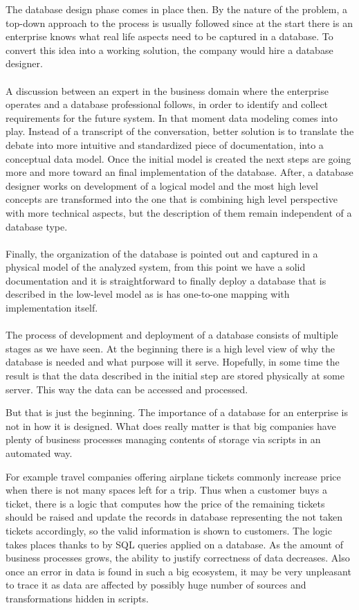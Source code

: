 The database design phase comes in place then. By the nature of the problem, a top-down approach to the process is usually followed since at the start there is an enterprise knows what real life aspects need to be captured in a database. To convert this idea into a working solution, the company would hire a database designer. \\ \\
A discussion between an expert in the business domain where the enterprise operates and a database professional follows, in order to identify and collect requirements for the future system.
In that moment data modeling comes into play. 
Instead of a transcript of the conversation, better solution is to translate the debate into more intuitive and standardized piece of documentation, into a conceptual data model.
Once the initial model is created the next steps are going more and more toward an final implementation of the database. After, a database designer works on development of a logical model and the most high level concepts are transformed into the one that is combining high level perspective with more technical aspects, but the description of them remain independent of a database type. \\ \\
Finally, the organization of the database is pointed out and captured in a physical model of the analyzed system, from this point we have a solid documentation and it is straightforward to finally deploy a database that is described in the low-level model as is has one-to-one mapping with implementation itself. \\ \\

The process of development and deployment of a database consists of multiple stages as we have seen. At the beginning there is a high level view of why the database is needed and what purpose will it serve. Hopefully, in some time the result is that the data described in the initial step are stored physically at some server. 
This way the data can be accessed and processed.

But that is just the beginning. The importance of a database for an enterprise is not in how it is designed. What does really matter is that big companies have plenty of business processes managing contents of storage via scripts in an automated way. 

For example travel companies offering airplane tickets commonly increase price when there is not many spaces left for a trip. 
Thus when a customer buys a ticket, there is a logic that computes how the price of the remaining tickets should be raised and update the records in database representing the not taken tickets accordingly, so the valid information is shown to customers.
The logic takes places thanks to by SQL queries applied on a database.
As the amount of business processes grows, the ability to justify correctness of data decreases. 
Also once an error in data is found in such a big ecosystem, it may be very unpleasant to trace it as data are affected by possibly huge number of sources and transformations hidden in scripts.

